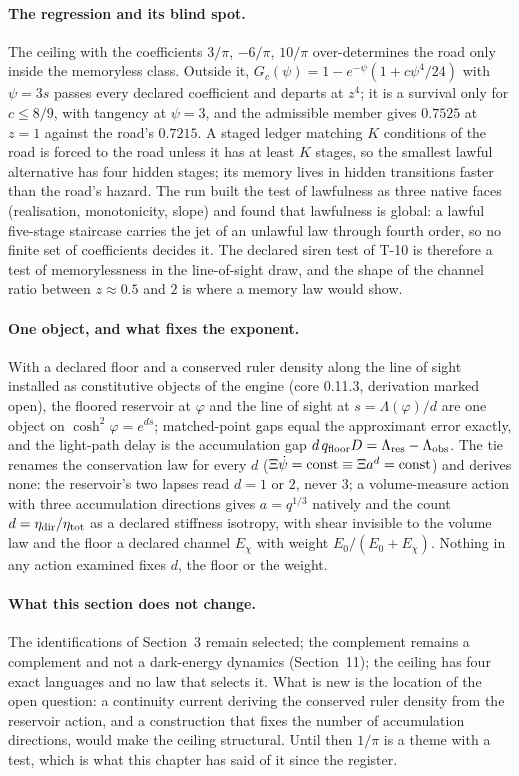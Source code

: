 \paragraph*{The regression and its blind spot.} The ceiling with the coefficients $3/\pi$, $-6/\pi$, $10/\pi$ over-determines the road only inside the memoryless class. Outside it, $G_c(\psi)=1-e^{-\psi}(1+c\psi^4/24)$ with $\psi=3s$ passes every declared coefficient and departs at $z^4$; it is a survival only for $c\le 8/9$, with tangency at $\psi=3$, and the admissible member gives $0.7525$ at $z=1$ against the road's $0.7215$. A staged ledger matching $K$ conditions of the road is forced to the road unless it has at least $K$ stages, so the smallest lawful alternative has four hidden stages; its memory lives in hidden transitions faster than the road's hazard. The run built the test of lawfulness as three native faces (realisation, monotonicity, slope) and found that lawfulness is global: a lawful five-stage staircase carries the jet of an unlawful law through fourth order, so no finite set of coefficients decides it. The declared siren test of T-10 is therefore a test of memorylessness in the line-of-sight draw, and the shape of the channel ratio between $z\approx0.5$ and $2$ is where a memory law would show.

\paragraph*{One object, and what fixes the exponent.} With a declared floor and a conserved ruler density along the line of sight installed as constitutive objects of the engine (core 0.11.3, derivation marked open), the floored reservoir at $\varphi$ and the line of sight at $s=\Lambda(\varphi)/d$ are one object on $\cosh^2\varphi=e^{ds}$; matched-point gaps equal the approximant error exactly, and the light-path delay is the accumulation gap $d\,q_{\rm floor}D=\Lambda_{\rm res}-\Lambda_{\rm obs}$. The tie renames the conservation law for every $d$ ($\Xi\dot\psi={\rm const}\equiv\Xi a^d={\rm const}$) and derives none: the reservoir's two lapses read $d=1$ or $2$, never $3$; a volume-measure action with three accumulation directions gives $a=q^{1/3}$ natively and the count $d=\eta_{\rm dir}/\eta_{\rm tot}$ as a declared stiffness isotropy, with shear invisible to the volume law and the floor a declared channel $E_\chi$ with weight $E_0/(E_0+E_\chi)$. Nothing in any action examined fixes $d$, the floor or the weight.

\paragraph*{What this section does not change.} The identifications of Section~3 remain selected; the complement remains a complement and not a dark-energy dynamics (Section~11); the ceiling has four exact languages and no law that selects it. What is new is the location of the open question: a continuity current deriving the conserved ruler density from the reservoir action, and a construction that fixes the number of accumulation directions, would make the ceiling structural. Until then $1/\pi$ is a theme with a test, which is what this chapter has said of it since the register.

